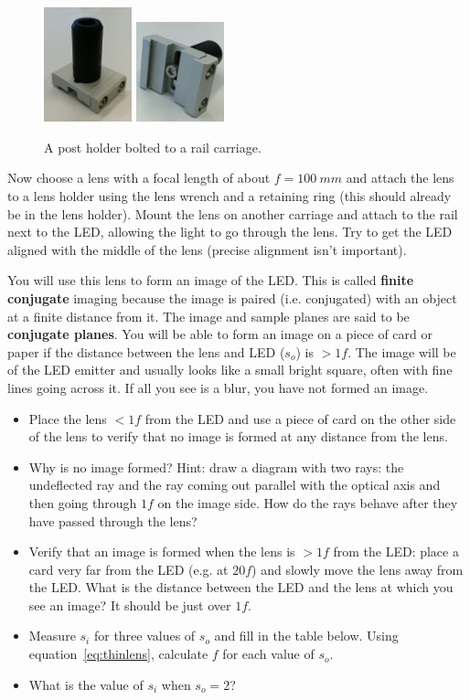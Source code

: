 \documentclass[a4paper]{report}
\begin{document}
\begin{figure}[h]
\center
\includegraphics[width=1in]{post_mounted.eps}
\includegraphics[width=1in]{post_mounted_underside.eps}
\caption{A post holder bolted to a rail carriage.}
\label{fig:post}
\end{figure}

Now choose a lens with a focal length of about $f=100~mm$ and attach the lens to a lens holder using the lens wrench and a retaining ring (this should already be in the lens holder).
Mount the lens on another carriage and attach to the rail next to the LED, allowing the light to go through the lens. 
Try to get the LED aligned with the middle of the lens (precise alignment isn't important). 

You will use this lens to form an image of the LED.
This is called \textbf{finite conjugate} imaging because the image is paired (i.e. conjugated) with an object at a finite distance from it.
The image and sample planes are said to be \textbf{conjugate planes}.
You will be able to form an image on a piece of card or paper if the distance between the lens and LED ($s_o$) is $>1f$.
The image will be of the LED emitter and usually looks like a small bright square, often with fine lines going across it. 
If all you see is a blur, you have not formed an image.

\begin{itemize}
\item Place the lens $<1f$ from the LED and use a piece of card on the other side of the lens to verify that no image is formed at any distance from the lens.
\item Why is no image formed? 
Hint: draw a diagram with two rays: the undeflected ray and the ray coming out parallel with the optical axis and then going through $1f$ on the image side. 
How do the rays behave after they have passed through the lens?
\item Verify that an image is formed when the lens is $>1f$ from the LED: place a card very far from the LED (e.g. at $20f$) and slowly move the lens away from the LED. 
What is the distance between the LED and the lens at which you see an image? 
It should be just over $1f$.
\item Measure $s_i$ for three values of $s_o$ and fill in the table below. 
Using equation~\ref{eq:thinlens}, calculate $f$ for each value of $s_o$.
\item What is the value of $s_i$ when $s_o=2$?
\end{itemize}
\end{document}
